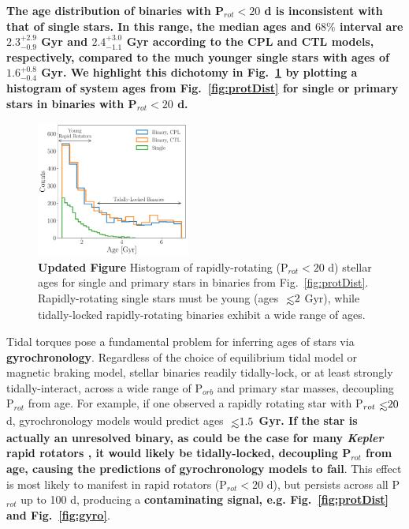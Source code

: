 \documentclass[twocolumn]{aastex61}
\def\lsim{~\rlap{$<$}{\lower 1.0ex\hbox{$\sim$}}}
\newcommand{\xxx}[1]{{\textbf{#1}}}
\newcommand{\kepler}[0]{\textit{Kepler}\xspace}
\begin{document}
\xxx{The age distribution of binaries with P$_{rot} < 20$ d is inconsistent with that of single stars. In this range, the median ages and $68\%$ interval are $2.3^{+2.9}_{-0.9}$ Gyr and $2.4^{+3.0}_{-1.1}$ Gyr according to the CPL and CTL models, respectively, compared to the much younger single stars with ages of $1.6^{+0.8}_{-0.4}$ Gyr. We highlight this dichotomy in Fig.~\ref{fig:protAgeHist} by plotting a histogram of system ages from Fig.~\ref{fig:protDist} for single or primary stars in binaries with P$_{rot} < 20$ d.}  

\begin{figure}[h]
	\includegraphics[width=0.45\textwidth]{../Plots/protAgeHist.pdf}
   \caption{\xxx{Updated Figure} Histogram of rapidly-rotating (P$_{rot} < 20$ d) stellar ages for single and primary stars in binaries from Fig.~\ref{fig:protDist}. Rapidly-rotating single stars must be young (ages $\lsim 2$ Gyr), while tidally-locked rapidly-rotating binaries exhibit a wide range of ages.}%
    \label{fig:protAgeHist}%
\end{figure}

Tidal torques pose a fundamental problem for inferring ages of stars via \xxx{gyrochronology}. Regardless of the choice of equilibrium tidal model or magnetic braking model, stellar binaries readily tidally-lock, or at least strongly tidally-interact, across a wide range of P$_{orb}$ and primary star masses, decoupling P$_{rot}$ from age. For example, if one observed a rapidly rotating star with P$_{rot} \lsim 20$ d, gyrochronology models would predict ages \xxx{$\lsim 1.5$ Gyr. If the star is actually an unresolved binary, as could be the case for many \kepler rapid rotators \citep{Simonian2018}, it would likely be tidally-locked, decoupling P$_{rot}$ from age, causing the predictions of gyrochronology models to fail}. This effect is most likely to manifest in rapid rotators (P$_{rot} < 20$ d), but persists across all P$_{rot}$ up to 100 d, producing a \xxx{contaminating signal, e.g. Fig.~\ref{fig:protDist} and Fig.~\ref{fig:gyro}}.
\end{document}
